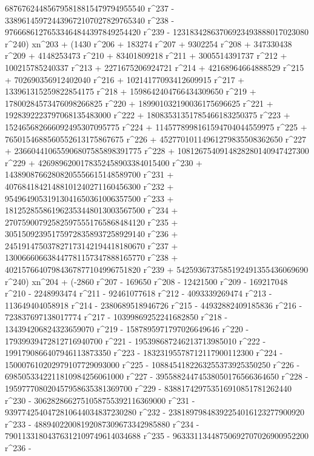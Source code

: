        687676244856795818815479794955540 r^237 - 
       338961459724439672107027829765340 r^238 - 
       97666861276533464844397849254420 r^239 - 
       12318342863706923493888017023080 r^240) xn^203 + (1430 r^206 + 
       183274 r^207 + 9302254 r^208 + 347330438 r^209 + 
       4148253473 r^210 + 83401809218 r^211 + 3005514391737 r^212 + 
       100215785240337 r^213 + 2271675206924721 r^214 + 
       42168964664888529 r^215 + 702690356912402040 r^216 + 
       10214177093412609915 r^217 + 133961315259822854175 r^218 + 
       1598642404766434309650 r^219 + 17800284573476098266825 r^220 + 
       189901032190036175696625 r^221 + 
       1928392223797068135483000 r^222 + 
       18083531351785466183250375 r^223 + 
       152465682666092495307095775 r^224 + 
       1145778998161594704044559975 r^225 + 
       7650154688560552613175867675 r^226 + 
       45277010114961279835508362650 r^227 + 
       236604410655906807585898391775 r^228 + 
       1081267540914828280140947427300 r^229 + 
       4269896200178352458903384015400 r^230 + 
       14389087662808205556615148589700 r^231 + 
       40768418421488101240271160456300 r^232 + 
       95496490531913041650361006357500 r^233 + 
       181252855861962353448013003567500 r^234 + 
       270759007925825975551765868484120 r^235 + 
       305150923951759728358937258929140 r^236 + 
       245191475037827173142194418180670 r^237 + 
       130066606638447781157347888165770 r^238 + 
       40215766407984367877104996751820 r^239 + 
       5425936737585192491355436069690 r^240) xn^204 + (-2860 r^207 - 
       169650 r^208 - 12421500 r^209 - 169217048 r^210 - 
       2248993474 r^211 - 92461077618 r^212 - 4093339269474 r^213 - 
       113649404058918 r^214 - 2380689518946726 r^215 - 
       44932882409185836 r^216 - 723837697138017774 r^217 - 
       10399869252241682850 r^218 - 134394206824323659070 r^219 - 
       1587895971797026649646 r^220 - 17939939472812716940700 r^221 - 
       195398687246213713985010 r^222 - 
       1991790866407946113873350 r^223 - 
       18323195578712117900112300 r^224 - 
       150007610202979107729093000 r^225 - 
       1088454182263255373925350250 r^226 - 
       6985053342211810984256061000 r^227 - 
       39558824474538050176566364650 r^228 - 
       195977708020457958635381369700 r^229 - 
       838817429753516910851781262440 r^230 - 
       3062828662751058755392116369000 r^231 - 
       9397742540472810644034837230280 r^232 - 
       23818979848392254016123277900920 r^233 - 
       48894022008192087309673342985880 r^234 - 
       79011331804376312109749614034688 r^235 - 
       96333113448750692707026900952200 r^236 - 

